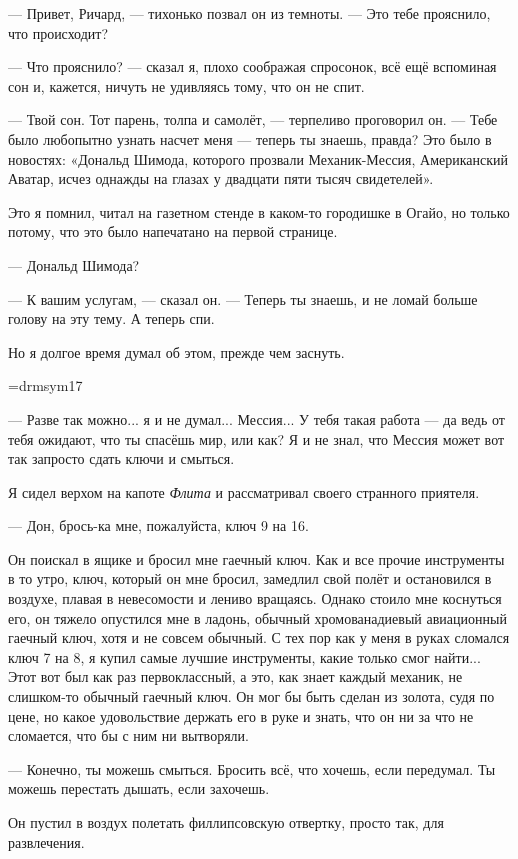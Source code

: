 --- Привет, Ричард, --- тихонько позвал он из темноты. --- Это тебе прояснило, что происходит?

--- Что прояснило? --- сказал я, плохо соображая спросонок, всё ещё вспоминая сон и, кажется, ничуть не удивляясь тому, что он не спит.

--- Твой сон. Тот парень, толпа и самолёт, --- терпеливо проговорил он. --- Тебе было любопытно узнать насчет меня --- теперь ты знаешь, правда? Это было в новостях: «Дональд Шимода, которого прозвали Механик-Мессия, Американский Аватар, исчез однажды на глазах у двадцати пяти тысяч свидетелей».

Это я помнил, читал на газетном стенде в каком-то городишке в Огайо, но только потому, что это было напечатано на первой странице.

--- Дональд Шимода?

--- К вашим услугам, --- сказал он. --- Теперь ты знаешь, и не ломай больше голову на эту тему. А теперь спи.

Но я долгое время думал об этом, прежде чем заснуть.

\vskip15pt
\hbox{\kern5cm\font\sym=drmsym17 \sym ^^10}
\vskip20pt

--- Разве так можно... я и не думал... Мессия... У тебя такая работа --- да ведь от тебя ожидают, что ты спасёшь мир, или как? Я и не знал, что Мессия может вот так запросто сдать ключи и смыться.

Я сидел верхом на капоте {\it Флита\/} и рассматривал своего странного приятеля.

--- Дон, брось-ка мне, пожалуйста, ключ 9 на 16.

Он поискал в ящике и бросил мне гаечный ключ. Как и все прочие инструменты в то утро, ключ, который он мне бросил, замедлил свой полёт и остановился в воздухе, плавая в невесомости и лениво вращаясь. Однако стоило мне коснуться его, он тяжело опустился мне в ладонь, обычный хромованадиевый авиационный гаечный ключ, хотя и не совсем обычный. С тех пор как у меня в руках сломался ключ 7 на 8, я купил самые лучшие инструменты, какие только смог найти... Этот вот был как раз первоклассный, а это, как знает каждый механик, не слишком-то обычный гаечный ключ. Он мог бы быть сделан из золота, судя по цене, но какое удовольствие держать его в руке и знать, что он ни за что не сломается, что бы с ним ни вытворяли.

--- Конечно, ты можешь смыться. Бросить всё, что хочешь, если передумал. Ты можешь перестать дышать, если захочешь.

Он пустил в воздух полетать филлипсовскую отвертку, просто так, для развлечения.

